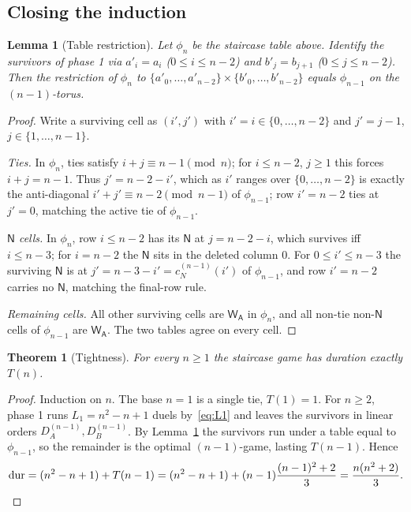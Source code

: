 \documentclass[11pt]{article}
\newtheorem{theorem}{Theorem}
\newtheorem{lemma}{Lemma}
\theoremstyle{definition}
\theoremstyle{remark}
\DeclareMathOperator{\dur}{dur}
\newcommand{\WA}{\mathsf{W_A}}
\newcommand{\NN}{\mathsf{N}}
\begin{document}
\subsection{Closing the induction}
\begin{lemma}[Table restriction]\label{lem:restrict}
Let $\phi_n$ be the staircase table above. Identify the survivors of phase 1 via $a'_i = a_i$ ($0 \le i \le n-2$) and
$b'_j = b_{j+1}$ ($0 \le j \le n-2$). Then the restriction of $\phi_n$ to $\{a'_0, \dots, a'_{n-2}\} \times
\{b'_0, \dots, b'_{n-2}\}$ equals $\phi_{n-1}$ on the $(n-1)$-torus.
\end{lemma}
\begin{proof}
Write a surviving cell as $(i', j')$ with $i' = i \in \{0, \dots, n-2\}$ and $j' = j - 1$, $j \in \{1, \dots, n-1\}$.

\emph{Ties.} In $\phi_n$, ties satisfy $i + j \equiv n - 1 \pmod n$; for $i \le n - 2$, $j \ge 1$ this forces
$i + j = n - 1$. Thus $j' = n - 2 - i'$, which as $i'$ ranges over $\{0, \dots, n-2\}$ is exactly the anti-diagonal
$i' + j' \equiv n - 2 \pmod{n-1}$ of $\phi_{n-1}$; row $i' = n-2$ ties at $j' = 0$, matching the active tie of
$\phi_{n-1}$.

\emph{$\NN$ cells.} In $\phi_n$, row $i \le n - 2$ has its $\NN$ at $j = n - 2 - i$, which survives iff $i \le n - 3$;
for $i = n - 2$ the $\NN$ sits in the deleted column $0$. For $0 \le i' \le n - 3$ the surviving $\NN$ is at
$j' = n - 3 - i' = c^{(n-1)}_N(i')$ of $\phi_{n-1}$, and row $i' = n - 2$ carries no $\NN$, matching the final-row rule.

\emph{Remaining cells.} All other surviving cells are $\WA$ in $\phi_n$, and all non-tie non-$\NN$ cells of $\phi_{n-1}$
are $\WA$. The two tables agree on every cell.
\end{proof}

\begin{theorem}[Tightness]\label{thm:tight}
For every $n \ge 1$ the staircase game has duration exactly $T(n)$.
\end{theorem}
\begin{proof}
Induction on $n$. The base $n = 1$ is a single tie, $T(1) = 1$. For $n \ge 2$, phase 1 runs $L_1 = n^2 - n + 1$ duels
by~\eqref{eq:L1} and leaves the survivors in linear orders $D^{(n-1)}_A, D^{(n-1)}_B$. By Lemma~\ref{lem:restrict} the
survivors run under a table equal to $\phi_{n-1}$, so the remainder is the optimal $(n-1)$-game, lasting $T(n-1)$. Hence
\[
\dur = (n^2 - n + 1) + T(n - 1) = (n^2 - n + 1) + (n - 1)\frac{(n - 1)^2 + 2}{3} = \frac{n(n^2 + 2)}{3}. \qedhere
\]
\end{proof}
\end{document}
